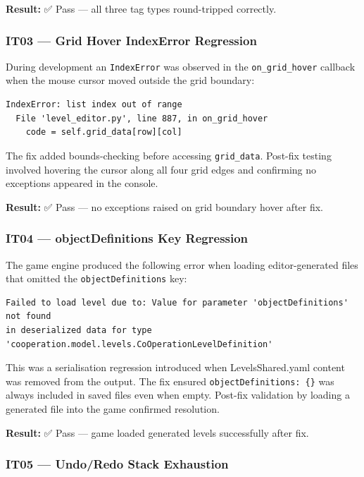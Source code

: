 \textbf{Result:} ✅ Pass --- all three tag types round-tripped
correctly.

\subsubsection{IT03 --- Grid Hover IndexError
Regression}\label{it03-grid-hover-indexerror-regression}

During development an \texttt{IndexError} was observed in the
\texttt{on\_grid\_hover} callback when the mouse cursor moved outside
the grid boundary:

\begin{verbatim}
IndexError: list index out of range
  File 'level_editor.py', line 887, in on_grid_hover
    code = self.grid_data[row][col]
\end{verbatim}

The fix added bounds-checking before accessing \texttt{grid\_data}.
Post-fix testing involved hovering the cursor along all four grid edges
and confirming no exceptions appeared in the console.

\textbf{Result:} ✅ Pass --- no exceptions raised on grid boundary hover
after fix.

\subsubsection{IT04 --- objectDefinitions Key
Regression}\label{it04-objectdefinitions-key-regression}

The game engine produced the following error when loading
editor-generated files that omitted the \texttt{objectDefinitions} key:

\begin{verbatim}
Failed to load level due to: Value for parameter 'objectDefinitions' not found
in deserialized data for type 'cooperation.model.levels.CoOperationLevelDefinition'
\end{verbatim}

This was a serialisation regression introduced when LevelsShared.yaml
content was removed from the output. The fix ensured
\texttt{objectDefinitions:\ \{\}} was always included in saved files
even when empty. Post-fix validation by loading a generated file into
the game confirmed resolution.

\textbf{Result:} ✅ Pass --- game loaded generated levels successfully
after fix.

\subsubsection{IT05 --- Undo/Redo Stack
Exhaustion}\label{it05-undoredo-stack-exhaustion}

